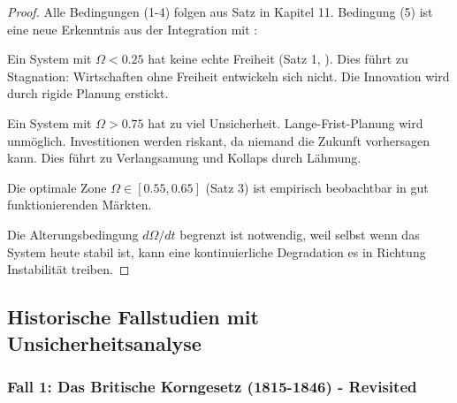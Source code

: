 \documentclass[a4paper,12pt,twoside]{report}
\theoremstyle{definition}
\begin{document}
\begin{proof}

Alle Bedingungen (1-4) folgen aus Satz in Kapitel 11. Bedingung (5) ist eine neue Erkenntnis aus der Integration mit \cite{epp_signal}:

Ein System mit $\Omega < 0.25$ hat keine echte Freiheit (Satz 1, \cite{epp_signal}). Dies führt zu Stagnation: Wirtschaften ohne Freiheit entwickeln sich nicht. Die Innovation wird durch rigide Planung erstickt.

Ein System mit $\Omega > 0.75$ hat zu viel Unsicherheit. Lange-Frist-Planung wird unmöglich. Investitionen werden riskant, da niemand die Zukunft vorhersagen kann. Dies führt zu Verlangsamung und Kollaps durch Lähmung.

Die optimale Zone $\Omega \in [0.55, 0.65]$ (Satz 3) ist empirisch beobachtbar in gut funktionierenden Märkten.

Die Alterungsbedingung $d\Omega/dt$ begrenzt ist notwendig, weil selbst wenn das System heute stabil ist, kann eine kontinuierliche Degradation es in Richtung Instabilität treiben.

\end{proof}

\subsection{Historische Fallstudien mit Unsicherheitsanalyse}

\subsubsection{Fall 1: Das Britische Korngesetz (1815-1846) - Revisited}
\end{document}
